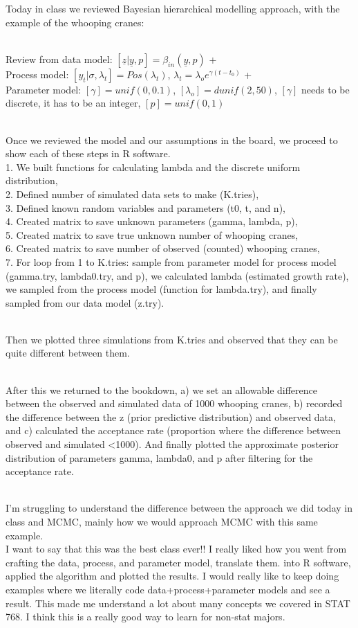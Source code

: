 \documentclass[
]{book}
\begin{document}
Today in class we reviewed Bayesian hierarchical modelling approach, with the example of the whooping cranes:\\
\strut \\
Review from data model: \([ \underline{z} |\underline{y},p]=\beta_{in}(\underline{y},p)\) +\\
Process model: \([y_t|\sigma, \lambda_t] = Pos(\lambda_t)\), \(\lambda_t=\lambda_oe^{\gamma(t-t_0)}\) +\\
Parameter model: \([\gamma]=unif(0,0.1)\), \([\lambda_o]=dunif(2,50)\), \([\gamma]\) needs to be discrete, it has to be an integer, \([p]=unif(0,1)\)\\
\strut \\
Once we reviewed the model and our assumptions in the board, we proceed to show each of these steps in R software.\\
1. We built functions for calculating lambda and the discrete uniform distribution,\\
2. Defined number of simulated data sets to make (K.tries),\\
3. Defined known random variables and parameters (t0, t, and n),\\
4. Created matrix to save unknown parameters (gamma, lambda, p),\\
5. Created matrix to save true unknown number of whooping cranes,\\
6. Created matrix to save number of observed (counted) whooping cranes,\\
7. For loop from 1 to K.tries: sample from parameter model for process model (gamma.try, lambda0.try, and p), we calculated lambda (estimated growth rate), we sampled from the process model (function for lambda.try), and finally sampled from our data model (z.try).\\
\strut \\
Then we plotted three simulations from K.tries and observed that they can be quite different between them.\\
\strut \\
After this we returned to the bookdown, a) we set an allowable difference between the observed and simulated data of 1000 whooping cranes, b) recorded the difference between the z (prior predictive distribution) and observed data, and c) calculated the acceptance rate (proportion where the difference between observed and simulated \textless1000). And finally plotted the approximate posterior distribution of parameters gamma, lambda0, and p after filtering for the acceptance rate.\\
\strut \\
I'm struggling to understand the difference between the approach we did today in class and MCMC, mainly how we would approach MCMC with this same example.\\
I want to say that this was the best class ever!! I really liked how you went from crafting the data, process, and parameter model, translate them. into R software, applied the algorithm and plotted the results. I would really like to keep doing examples where we literally code data+process+parameter models and see a result. This made me understand a lot about many concepts we covered in STAT 768. I think this is a really good way to learn for non-stat majors.
\end{document}
